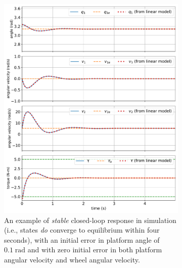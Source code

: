 \documentclass[conf]{new-aiaa}
\begin{document}
\begin{figure}[p]
\centering
\begin{subfigure}[t]{0.49\textwidth}
\centering
\includegraphics[width=\textwidth]{fig01}
\caption{An example of {\em stable} closed-loop response in simulation (i.e., states {\em do} converge to equilibrium within four seconds), with an initial error in platform angle of $0.1\;\text{rad}$ and with zero initial error in both platform angular velocity and wheel angular velocity.}
\label{fig-stable}
\end{subfigure}
\hfill
\begin{subfigure}[t]{0.49\textwidth}
\centering

\end{subfigure}
\end{figure}
\end{document}
